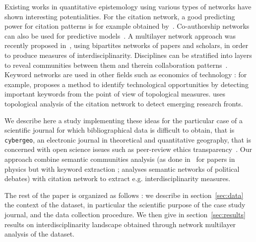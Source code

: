 Existing works in quantitative epistemology using various types of networks have shown interesting potentialities. For the citation network, a good predicting power for citation patterns is for example obtained by~\cite{2013arXiv1310.8220N}. Co-authorship networks can also be used for predictive models~\cite{2014arXiv1402.7268S}. A multilayer network approach was recently proposed in~\cite{2016arXiv160106075O}, using bipartites networks of papers and scholars, in order to produce measures of interdisciplinarity. Disciplines can be stratified into layers to reveal communities between them and therein collaboration patterns~\cite{2015arXiv150601280B}. Keyword networks are used in other fields such as economics of technology : for example, \cite{choi2014patent} proposes a method to identify technological opportunities by detecting important keywords from the point of view of topological measures. \cite{shibata2008detecting} uses topological analysis of the citation network to detect emerging research fronts.

We describe here a study implementing these ideas for the particular case of a scientific journal for which bibliographical data is difficult to obtain, that is \texttt{cybergeo}, an electronic journal in theoretical and quantitative geography, that is concerned with open science issues such as peer-review ethics transparency~\cite{10.1371/journal.pone.0147913}. Our approach combine semantic communities analysis (as done in~\cite{2016arXiv160208451P} for papers in physics but with keyword extraction ; \cite{2015arXiv151003797G} analyses semantic networks of political debates) with citation network to extract e.g. interdisciplinarity measures.









The rest of the paper is organized as follows : we describe in section~\ref{sec:data} the context of the dataset, in particular the scientific purpose of the case study journal, and the data collection procedure. We then give in section~\ref{sec:results} results on interdisciplinarity landscape obtained through network multilayer analysis of the dataset.






